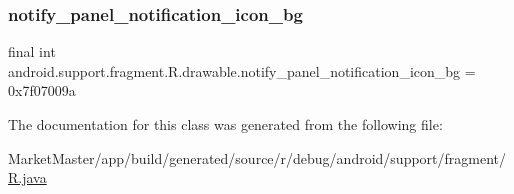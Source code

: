 \subsubsection{\texorpdfstring{notify\+\_\+panel\+\_\+notification\+\_\+icon\+\_\+bg}{notify\_panel\_notification\_icon\_bg}}
{\footnotesize\ttfamily final int android.\+support.\+fragment.\+R.\+drawable.\+notify\+\_\+panel\+\_\+notification\+\_\+icon\+\_\+bg = 0x7f07009a\hspace{0.3cm}{\ttfamily [static]}}



The documentation for this class was generated from the following file\+:\begin{DoxyCompactItemize}
\item 
Market\+Master/app/build/generated/source/r/debug/android/support/fragment/\mbox{\hyperlink{debug_2android_2support_2fragment_2R_8java}{R.\+java}}\end{DoxyCompactItemize}

